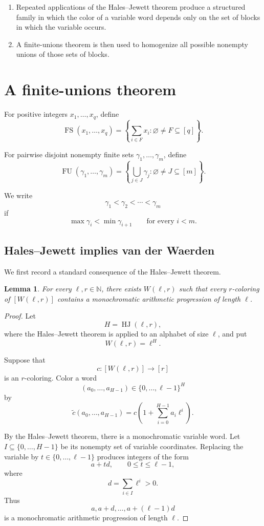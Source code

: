 \documentclass[11pt]{article}
\newtheorem{lemma}[theorem]{Lemma}
\newcommand{\N}{\mathbb N}
\newcommand{\HJ}{\operatorname{HJ}}
\newcommand{\FU}{\operatorname{FU}}
\newcommand{\FS}{\operatorname{FS}}
\begin{document}
\begin{enumerate}[label=\arabic*.]
  \item Repeated applications of the Hales--Jewett theorem produce a
    structured family in which the color of a variable word depends
    only on the set of blocks in which the variable occurs.
  \item A finite-unions theorem is then used to homogenize all possible
    nonempty unions of those sets of blocks.
\end{enumerate}

\section{A finite-unions theorem}

For positive integers \(x_1,\dots,x_q\), define
\[
  \FS(x_1,\dots,x_q)
  =
  \left\{
    \sum_{i\in F}x_i:
    \varnothing\neq F\subseteq [q]
  \right\}.
\]

For pairwise disjoint nonempty finite sets
\(\gamma_1,\dots,\gamma_m\), define
\[
  \FU(\gamma_1,\dots,\gamma_m)
  =
  \left\{
    \bigcup_{j\in J}\gamma_j:
    \varnothing\neq J\subseteq[m]
  \right\}.
\]

We write
\[
  \gamma_1<\gamma_2<\cdots<\gamma_m
\]
if
\[
  \max\gamma_i<\min\gamma_{i+1}
  \qquad
  \text{for every }i<m.
\]

\subsection{Hales--Jewett implies van der Waerden}

We first record a standard consequence of the Hales--Jewett theorem.

\begin{lemma}
  \label{lem:vdW}
  For every \(\ell,r\in\N\), there exists \(W(\ell,r)\) such that every
  \(r\)-coloring of \([W(\ell,r)]\) contains a monochromatic arithmetic
  progression of length \(\ell\).
\end{lemma}

\begin{proof}
  Let
  \[
    H=\HJ(\ell,r),
  \]
  where the Hales--Jewett theorem is applied to an alphabet of size
  \(\ell\), and put
  \[
    W(\ell,r)=\ell^H.
  \]

  Suppose that
  \[
    c:[W(\ell,r)]\longrightarrow[r]
  \]
  is an \(r\)-coloring. Color a word
  \[
    (a_0,\dots,a_{H-1})\in\{0,\dots,\ell-1\}^H
  \]
  by
  \[
    \widetilde c(a_0,\dots,a_{H-1})
    =
    c\left(
      1+\sum_{i=0}^{H-1}a_i\ell^i
    \right).
  \]

  By the Hales--Jewett theorem, there is a monochromatic variable word.
  Let \(I\subseteq\{0,\dots,H-1\}\) be its nonempty set of variable
  coordinates. Replacing the variable by \(t\in\{0,\dots,\ell-1\}\)
  produces integers of the form
  \[
    a+td,
    \qquad
    0\leq t\leq \ell-1,
  \]
  where
  \[
    d=\sum_{i\in I}\ell^i>0.
  \]
  Thus
  \[
    a,a+d,\dots,a+(\ell-1)d
  \]
  is a monochromatic arithmetic progression of length \(\ell\).
\end{proof}
\end{document}
